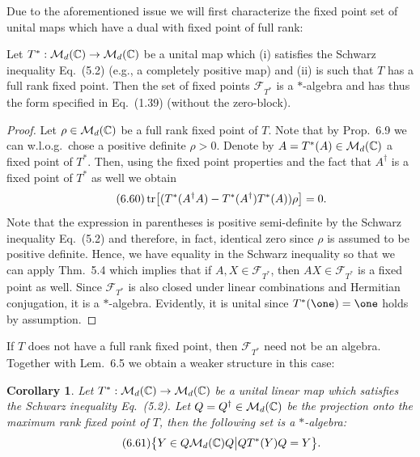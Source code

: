 \documentclass[11pt,a4paper]{article}
\theoremstyle{plain}
\newtheorem{corollary}{Corollary}[section]
\theoremstyle{definition}
\theoremstyle{remark}
\begin{document}
Due to the aforementioned issue we will first characterize the fixed point set
of unital maps which have a dual with fixed point of full rank:

\begin{theorem}
    Let $T^*:\mathcal{M}_d(\mathbb{C})\to\mathcal{M}_d(\mathbb{C})$ be a unital map which (i) satisfies the
    Schwarz inequality Eq.~(5.2) (e.g., a completely positive map) and (ii) is such
    that $T$ has a full rank fixed point. Then the set of fixed points $\mathcal{F}_{T^*}$ is
    a $*$-algebra and has thus the form specified in Eq.~(1.39) (without the
    zero-block).
\end{theorem}

\begin{proof}
    Let $\rho\in\mathcal{M}_d(\mathbb{C})$ be a full rank fixed point of $T$. Note that by
    Prop.~6.9 we can w.l.o.g.\ chose a positive definite $\rho>0$. Denote by
    $A=T^*(A)\in\mathcal{M}_d(\mathbb{C})$ a fixed point of $T^*$. Then, using the fixed point
    properties and the fact that $A^\dagger$ is a fixed point of $T^*$ as well we obtain
    \begin{equation}\tag{6.60}
        \operatorname{tr}\!\left[(T^*(A^\dagger A)-T^*(A^\dagger)T^*(A))\rho\right]=0.
    \end{equation}
    Note that the expression in parentheses is positive semi-definite by the Schwarz
    inequality Eq.~(5.2) and therefore, in fact, identical zero since $\rho$ is assumed
    to be positive definite. Hence, we have equality in the Schwarz inequality so that
    we can apply Thm.~5.4 which implies that if $A,X\in \mathcal{F}_{T^*}$, then $AX\in \mathcal{F}_{T^*}$
    is a fixed point as well. Since $\mathcal{F}_{T^*}$ is also closed under linear combinations
    and Hermitian conjugation, it is a $*$-algebra. Evidently, it is unital since
    $T^*(\one)=\one$ holds by assumption.
\end{proof}

If $T$ does not have a full rank fixed point, then $\mathcal{F}_{T^*}$ need not be an
algebra. Together with Lem.~6.5 we obtain a weaker structure in this case:

\begin{corollary}
    Let $T^*:\mathcal{M}_d(\mathbb{C})\to\mathcal{M}_d(\mathbb{C})$ be a unital linear map which satisfies the
    Schwarz inequality Eq.~(5.2). Let $Q=Q^\dagger\in\mathcal{M}_d(\mathbb{C})$ be the projection
    onto the maximum rank fixed point of $T$, then the following set is a
    $*$-algebra:
    \begin{equation}\tag{6.61}
        \bigl\{Y\in Q\mathcal{M}_d(\mathbb{C})Q \big| QT^*(Y)Q=Y\bigr\}.
    \end{equation}
\end{corollary}
\end{document}
